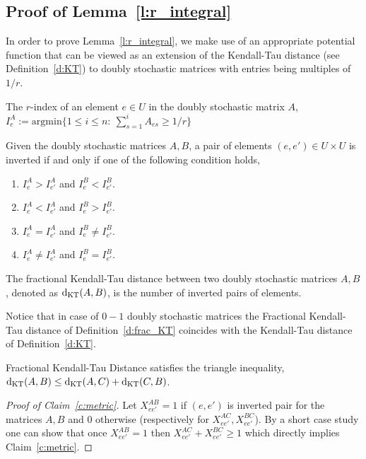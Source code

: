 \subsection{Proof of Lemma~\ref{l:r_integral}}\label{sub:greedy_1}
In order to prove Lemma~\ref{l:r_integral}, we make use of an appropriate potential function that can be viewed as an extension of the Kendall-Tau distance (see Definition~\ref{d:KT}) to doubly stochastic matrices with entries being multiples of $1/r$.
\begin{definition}
The $r$-index of an element $e \in U$ in the doubly stochastic matrix $A$, $I_e^A:=\mathrm{argmin}\{1\leq i \leq n:~ \sum_{s=1}^i A_{es} \geq 1/r\}$
\end{definition}

\begin{definition}\label{d:frac_KT} Given the doubly stochastic matrices $A,B$, a pair of elements $(e, e') \in U \times U$ is inverted if and only if one of the following condition holds,
\begin{enumerate}
    \item $I_e^A > I_{e'}^A$ and $I_e^B < I_{e'}^B$.
    \item $I_e^A < I_{e'}^A$ and $I_e^B > I_{e'}^B$.
    \item $I_e^A = I_{e'}^A$ and $I_e^B \neq I_{e'}^B$.
    \item $I_e^A \neq I_{e'}^A$ and $I_e^B = I_{e'}^B$.
\end{enumerate}
The fractional Kendall-Tau distance between two doubly stochastic matrices $A,B$, denoted as $\mathrm{d}_{\mathrm{KT}}(A,B)$, is the number of inverted pairs of elements. 
\end{definition}
\noindent Notice that in case of $0-1$ doubly stochastic matrices the Fractional Kendall-Tau distance of Definition~\ref{d:frac_KT} coincides with the Kendall-Tau distance of Definition~\ref{d:KT}. 

\begin{claim}\label{c:metric}
Fractional Kendall-Tau Distance satisfies the triangle inequality, $\mathrm{d}_{\mathrm{KT}}(A,B) \leq \mathrm{d}_{\mathrm{KT}}(A,C) + \mathrm{d}_{\mathrm{KT}}(C,B)$.
\end{claim}

\begin{proof}[Proof of Claim~\ref{c:metric}]
Let $X_{ee'}^{AB} = 1$ if $(e,e')$ is inverted pair for the matrices $A,B$ and $0$ otherwise (respectively for $X_{ee'}^{AC},X_{ee'}^{BC}$). By a short case study one can show that once $X_{ee'}^{AB} = 1$ then
$X_{ee'}^{AC} + X_{ee'}^{BC} \geq 1$ which directly implies Claim~\ref{c:metric}.
\end{proof}

